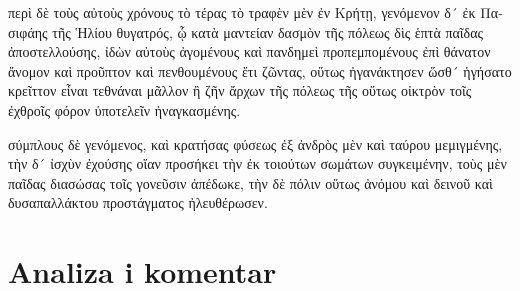 {\large

\begin{greek}

\noindent περὶ δὲ τοὺς αὐτοὺς χρόνους τὸ τέρας τὸ τραφὲν μὲν ἐν Κρήτῃ, γενόμενον δ´ ἐκ Πασιφάης τῆς Ἡλίου θυγατρός, ᾧ κατὰ μαντείαν δασμὸν τῆς πόλεως δὶς ἑπτὰ παῖδας ἀποστελλούσης, ἰδὼν αὐτοὺς ἀγομένους καὶ πανδημεὶ προπεμπομένους ἐπὶ θάνατον ἄνομον καὶ προῦπτον καὶ πενθουμένους ἔτι ζῶντας, οὕτως ἠγανάκτησεν ὥσθ´ ἡγήσατο κρεῖττον εἶναι τεθνάναι μᾶλλον ἢ ζῆν ἄρχων τῆς πόλεως τῆς οὕτως οἰκτρὸν τοῖς ἐχθροῖς φόρον ὑποτελεῖν ἠναγκασμένης.


\noindent σύμπλους δὲ γενόμενος, καὶ κρατήσας φύσεως ἐξ ἀνδρὸς μὲν καὶ ταύρου μεμιγμένης, τὴν δ´ ἰσχὺν ἐχούσης οἵαν προσήκει τὴν ἐκ τοιούτων σωμάτων συγκειμένην, τοὺς μὲν παῖδας διασώσας τοῖς γονεῦσιν ἀπέδωκε, τὴν δὲ πόλιν οὕτως ἀνόμου καὶ δεινοῦ καὶ δυσαπαλλάκτου προστάγματος ἠλευθέρωσεν.

\end{greek}

}


\section*{Analiza i komentar}


